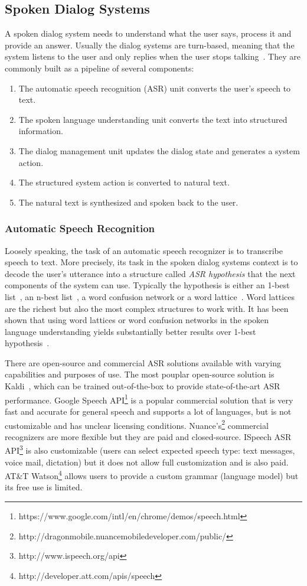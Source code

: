 \documentclass[11pt,twocolumn]{article}
\begin{document}
\subsection{Spoken Dialog Systems}
\label{sec:spoken_dialog_systems}
A spoken dialog system needs to understand what the user says, process it and provide an answer. Usually the dialog systems are turn-based, meaning that the system listens to the user and only replies when the user stops talking~\cite{thomson2010bayesian}. They are commonly built as a pipeline of several components:
\begin{enumerate}
  \item The automatic speech recognition (ASR) unit converts the user's speech to text.
  \item The spoken language understanding unit converts the text into structured information.
  \item The dialog management unit updates the dialog state and generates a system action.
  \item The structured system action is converted to natural text.
  \item The natural text is synthesized and spoken back to the user.
\end{enumerate}

\subsubsection{Automatic Speech Recognition}
Loosely speaking, the task of an automatic speech recognizer is to transcribe speech to text. More precisely, its task in the spoken dialog systems context is to decode the user's utterance into a structure called \emph{ASR hypothesis} that the next components of the system can use. Typically the hypothesis is either an 1-best list~\cite{gorin1997may,wang2003word}, an n-best list~\cite{he2003data}, a word confusion network\cite{hakkani2006beyond} or a word lattice~\cite{oerder1993word}. Word lattices are the richest but also the most complex structures to work with. It has been shown that using word lattices or word confusion networks in the spoken language understanding yields substantially better results over 1-best hypothesis~\cite{tur2002improving}.

There are open-source and commercial ASR solutions available with varying capabilities and purposes of use. The most pouplar open-source solution is Kaldi~\cite{povey2011kaldi}, which can be trained out-of-the-box to provide state-of-the-art ASR performance. Google Speech API\footnote{https://www.google.com/intl/en/chrome/demos/speech.html} is a popular commercial solution that is very fast and accurate for general speech and supports a lot of languages, but is not customizable and has unclear licensing conditions. Nuance's\footnote{http://dragonmobile.nuancemobiledeveloper.com/public/} commercial recognizers are more flexible but they are paid and closed-source. ISpeech ASR API\footnote{http://www.ispeech.org/api} is also customizable (users can select expected speech type: text messages, voice mail, dictation) but it does not allow full customization and is also paid. AT\&T Watson\footnote{http://developer.att.com/apis/speech} allows users to provide a custom grammar (language model) but
its free use is limited.
\end{document}
